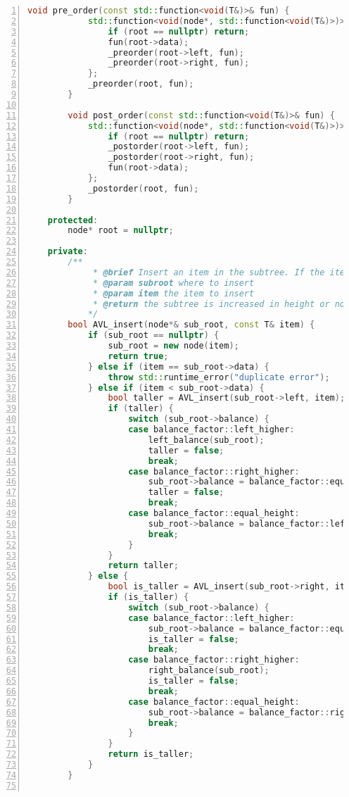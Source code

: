 \documentclass{article}
\begin{document}
\begin{lstlisting}[xleftmargin = 2em,xrightmargin = 2em, aboveskip = 0.5em, numbers = left, language = C++]
        void pre_order(const std::function<void(T&)>& fun) {
            std::function<void(node*, std::function<void(T&)>)> _preorder = [&](node* root, std::function<void(T&)> fun) {
                if (root == nullptr) return;
                fun(root->data);
                _preorder(root->left, fun);
                _preorder(root->right, fun);
            };
            _preorder(root, fun);
        }

        void post_order(const std::function<void(T&)>& fun) {
            std::function<void(node*, std::function<void(T&)>)> _postorder = [&](node* root, std::function<void(T&)> fun) {
                if (root == nullptr) return;
                _postorder(root->left, fun);
                _postorder(root->right, fun);
                fun(root->data);
            };
            _postorder(root, fun);
        }

    protected:
        node* root = nullptr;

    private:
        /**
    		 * @brief Insert an item in the subtree. If the item is already in the subtree, throw a duplicate_errer.
    		 * @param subroot where to insert
    		 * @param item the item to insert
    		 * @return the subtree is increased in height or not
    		*/
        bool AVL_insert(node*& sub_root, const T& item) {
            if (sub_root == nullptr) {
                sub_root = new node(item);
                return true;
            } else if (item == sub_root->data) {
                throw std::runtime_error("duplicate error");
            } else if (item < sub_root->data) {
                bool taller = AVL_insert(sub_root->left, item);
                if (taller) {
                    switch (sub_root->balance) {
                    case balance_factor::left_higher:
                        left_balance(sub_root);
                        taller = false;
                        break;
                    case balance_factor::right_higher:
                        sub_root->balance = balance_factor::equal_height;
                        taller = false;
                        break;
                    case balance_factor::equal_height:
                        sub_root->balance = balance_factor::left_higher;
                        break;
                    }
                }
                return taller;
            } else {
                bool is_taller = AVL_insert(sub_root->right, item);
                if (is_taller) {
                    switch (sub_root->balance) {
                    case balance_factor::left_higher:
                        sub_root->balance = balance_factor::equal_height;
                        is_taller = false;
                        break;
                    case balance_factor::right_higher:
                        right_balance(sub_root);
                        is_taller = false;
                        break;
                    case balance_factor::equal_height:
                        sub_root->balance = balance_factor::right_higher;
                        break;
                    }
                }
                return is_taller;
            }
        }


\end{lstlisting}
\end{document}
